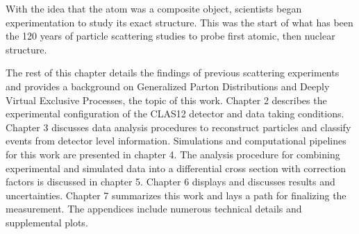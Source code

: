 With the idea that the atom was a composite object, scientists began experimentation to study its exact structure. This was the start of what has been the 120 years of particle scattering studies to probe first atomic, then nuclear structure. 

The rest of this chapter details the findings of previous scattering experiments and provides a background on Generalized Parton Distributions and Deeply Virtual Exclusive Processes, the topic of this work. Chapter 2 describes the experimental configuration of the CLAS12 detector and data taking conditions. Chapter 3 discusses data analysis procedures to reconstruct particles and classify events from detector level information. Simulations and computational pipelines for this work are presented in chapter 4. The analysis procedure for combining experimental and simulated data into a differential cross section with correction factors is discussed in chapter 5. Chapter 6 displays and discusses results and uncertainties. Chapter 7 summarizes this work and lays a path for finalizing the measurement. The appendices include numerous technical details and supplemental plots. 





         
 

